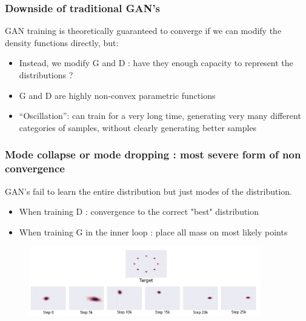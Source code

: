 \documentclass[french,9pt]{beamer}
\begin{document}
\begin{frame}
\frametitle{Downside of traditional GAN's}

GAN training is theoretically guaranteed to converge if we can modify the density functions directly, but:

\begin{itemize}
\item Instead, we modify G and D  : have they enough capacity to represent the distributions ?
\item  G and D are highly non-convex parametric functions
\item “Oscillation”: can train for a very long time, generating very many different categories of samples, without clearly generating better samples
\end{itemize}

\end{frame}



\begin{frame}
\frametitle{Mode collapse or mode dropping : most severe form of non convergence}
GAN's fail to learn the entire distribution but just modes of the distribution.

\begin{itemize}
\item When training D : convergence to the correct "best" distribution
\item When training G in the inner loop : place all mass on most likely points
\end{itemize}
 \begin{figure}
  \begin{center}
    \includegraphics[width=0.9\textwidth]{fig/mode_collapse}
  \end{center}
\end{figure}
\end{frame}

\end{document}
